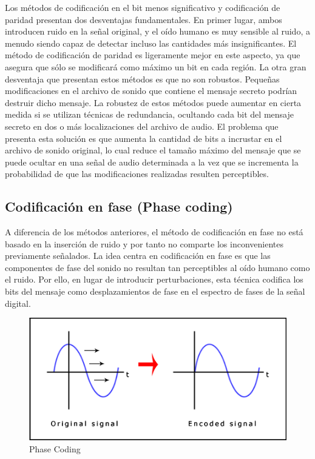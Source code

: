 \documentclass[12pt]{article}
\begin{document}
\bigskip

Los métodos de codificación en el bit menos significativo y codificación de paridad presentan dos desventajas fundamentales. En primer lugar, ambos introducen ruido en la señal original, y el oído humano es muy sensible al ruido, a menudo siendo capaz de detectar incluso las cantidades más insignificantes. El método de codificación de paridad es ligeramente mejor en este aspecto, ya que asegura que sólo se modificará como máximo un bit en cada región. La otra gran desventaja que presentan estos métodos es que no son robustos. Pequeñas modificaciones en el archivo de sonido que contiene el mensaje secreto podrían destruir dicho mensaje. La robustez de estos métodos puede aumentar en cierta medida si se utilizan técnicas de redundancia, ocultando cada bit del mensaje secreto en dos o más localizaciones del archivo de audio. El problema que presenta esta solución es que aumenta la cantidad de bits a incrustar en el archivo de sonido original, lo cual reduce el tamaño máximo del mensaje que se puede ocultar en una señal de audio determinada a la vez que se incrementa la probabilidad de que las modificaciones realizadas resulten perceptibles.

\subsection{Codificación en fase (Phase coding)}

A diferencia de los métodos anteriores, el método de codificación en fase no está basado en la inserción de ruido y por tanto no comparte los inconvenientes previamente señalados. La idea centra en codificación en fase es que las componentes de fase del sonido no resultan tan perceptibles al oído humano como el ruido. Por ello, en lugar de introducir perturbaciones, esta técnica codifica los bits del mensaje como desplazamientos de fase en el espectro de fases de la señal digital.

\begin{figure}
  \centering
    \includegraphics[width=\textwidth]{img/phaseshift}
  \caption{Phase Coding}
  \label{phasecoding}
\end{figure}
\end{document}
